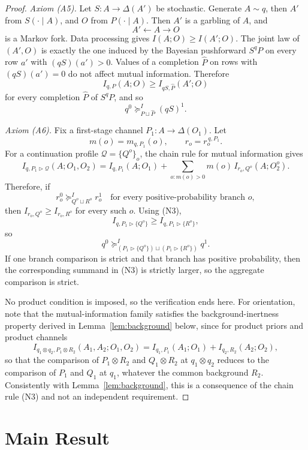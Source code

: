 \documentclass[11pt,a4paper]{article}
\theoremstyle{definition}
\newcommand{\1}{\mathbf 1}
\begin{document}
\begin{proof}
\emph{Axiom \textup{(A5)}.}
Let $S:A\to\Delta(A')$ be stochastic.  Generate $A\sim q$, then $A'$ from $S(\cdot\mid A)$, and $O$ from
$P(\cdot\mid A)$.  Then $A'$ is a garbling of $A$, and
\[
A'\longleftarrow A\longrightarrow O
\]
is a Markov fork.  Data processing gives $I(A;O)\ge I(A';O)$.  The joint law of $(A',O)$ is exactly the one induced by the
Bayesian pushforward $S^qP$ on every row $a'$ with $(qS)(a')>0$.  Values of a completion $\widehat P$ on rows with
$(qS)(a')=0$ do not affect mutual information.  Therefore
\[
I_{q,P}(A;O)\ge I_{qS,\widehat P}(A';O)
\]
for every completion $\widehat P$ of $S^qP$, and so
\[
q^0\succeq^I_{P\sqcup\widehat P}(qS)^1.
\]

\emph{Axiom \textup{(A6)}.}
Fix a first-stage channel $P_1:A\to\Delta(O_1)$.  Let
\[
m(o)=m_{q,P_1}(o),
\qquad
r_o=r_o^{\,q,P_1}.
\]
For a continuation profile $\mathcal Q=\{Q^o\}_o$, the chain rule for mutual information gives
\[
I_{q,P_1\triangleright\mathcal Q}(A;O_1,O_2)
=
I_{q,P_1}(A;O_1)
+
\sum_{o:m(o)>0}m(o)\,I_{r_o,Q^o}(A;O_2^o).
\tag{N3}
\]
Therefore, if
\[
r_o^0\succeq^I_{Q^o\sqcup R^o}r_o^1
\quad\text{for every positive-probability branch }o,
\]
then $I_{r_o,Q^o}\ge I_{r_o,R^o}$ for every such $o$.  Using (N3),
\[
I_{q,P_1\triangleright\{Q^o\}}
\ge
I_{q,P_1\triangleright\{R^o\}},
\]
so
\[
q^0
\succeq^I_{(P_1\triangleright\{Q^o\})\sqcup(P_1\triangleright\{R^o\})}
q^1.
\]
If one branch comparison is strict and that branch has positive probability, then the corresponding summand in (N3) is
strictly larger, so the aggregate comparison is strict.

No product condition is imposed, so the verification ends here.  For orientation, note that the mutual-information
family satisfies the background-inertness property derived in Lemma~\ref{lem:background} below, since for product priors
and product channels
\[
I_{q_1\otimes q_2,P_1\otimes R_2}(A_1,A_2;O_1,O_2)
=
I_{q_1,P_1}(A_1;O_1)+I_{q_2,R_2}(A_2;O_2),
\tag{N4}
\]
so that the comparison of $P_1\otimes R_2$ and $Q_1\otimes R_2$ at $q_1\otimes q_2$ reduces to the comparison of $P_1$
and $Q_1$ at $q_1$, whatever the common background $R_2$.  Consistently with Lemma~\ref{lem:background}, this is a
consequence of the chain rule (N3) and not an independent requirement.
\end{proof}

\section*{Main Result}
\end{document}
